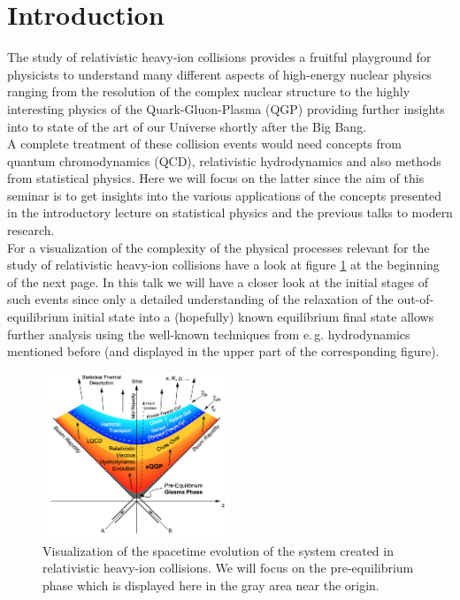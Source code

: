 \section{Introduction}
The study of relativistic heavy-ion collisions provides a fruitful playground for physicists to understand many different aspects of high-energy nuclear physics ranging from the resolution of the complex nuclear structure to the highly interesting physics of the Quark-Gluon-Plasma (QGP) providing further insights into to state of the art of our Universe shortly after the Big Bang. \\
A complete treatment of these collision events would need concepts from quantum chromodynamics (QCD), relativistic hydrodynamics and also methods from statistical physics. Here we will focus on the latter since the aim of this seminar is to get insights into the various applications of the concepts presented in the introductory lecture on statistical physics and the previous talks to modern research.\\
For a visualization of the complexity of the physical processes relevant for the study of relativistic heavy-ion collisions have a look at figure \ref{fig:phases} at the beginning of the next page. In this talk we will have a closer look at the initial stages of such events since only a detailed understanding of the relaxation of the out-of-equilibrium initial state into a (hopefully) known equilibrium final state allows further analysis using the well-known techniques from e.\,g. hydrodynamics mentioned before (and displayed in the upper part of the corresponding figure). \newpage
\begin{figure}[t]
\centering
\includegraphics[width = 0.5\textwidth]{figures/rhic_schematic}
\caption[Visualization of the spacetime evolution of the system created in relativistic heavy-ion collisions.]{Visualization of the spacetime evolution of the system created in relativistic heavy-ion collisions. We will focus on the pre-equilibrium phase which is displayed here in the gray area near the origin.\footnotemark }
\label{fig:phases}
\end{figure}
